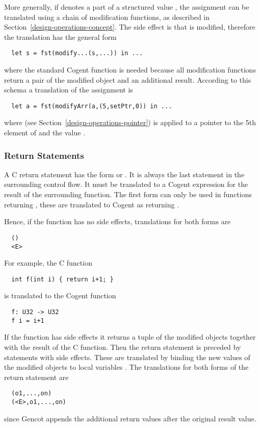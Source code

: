 More generally, if  denotes a part of a structured value , the assignment can be translated using
a chain of modification functions, as described in Section~\ref{design-operations-concept}. The side effect is
that  is modified, therefore the translation has the general form
\begin{verbatim}
  let s = fst(modify...(s,...)) in ...
\end{verbatim}
where the standard Cogent function  is needed because all modification functions return a pair of the modified
object and an additional result. According to this schema a translation of the assignment  is
\begin{verbatim}
  let a = fst(modifyArr(a,(5,setPtr,0)) in ...
\end{verbatim}
where  (see Section~\ref{design-operations-pointer}) is applied to a pointer to the 5th element of 
and the value .

\subsubsection{Return Statements}

A C return statement has the form  or . It is always the last statement in the surrounding
control flow. It must be translated to a Cogent expression for the result of the surrounding function. The first form can
only be used in functions returning , these are translated to Cogent as returning \code{()}. 

Hence, if the function has no side effects, translations for both forms are
\begin{verbatim}
  ()
  <E>
\end{verbatim}
For example, the C function
\begin{verbatim}
  int f(int i) { return i+1; }
\end{verbatim}
is translated to the Cogent function
\begin{verbatim}
  f: U32 -> U32
  f i = i+1
\end{verbatim}

If the function has side effects it returns a tuple of the modified objects together with the result of the C function.
Then the return statement is preceded by statements with side effects. These are 
translated by binding the new values of the modified objects to local variables . The translations 
for both forms of the return statement are
\begin{verbatim}
  (o1,...,on)
  (<E>,o1,...,on)
\end{verbatim}
since Gencot appends the additional return values after the original result value.

